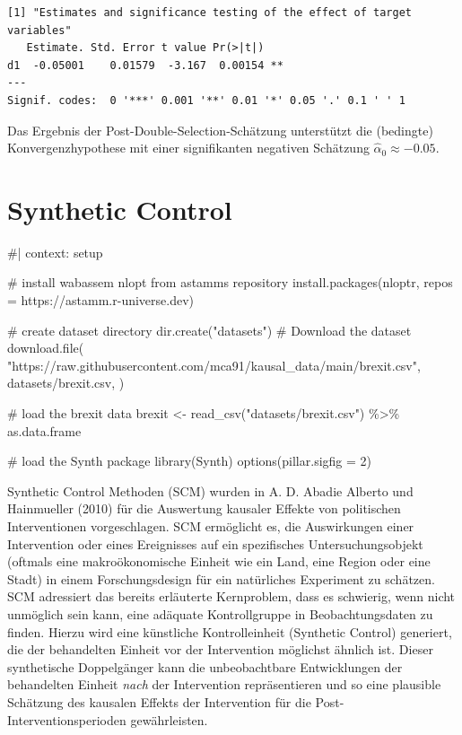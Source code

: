 \documentclass[
  a4paper,
  DIV=11,
  oneside]{scrreprt}
\newenvironment{Shaded}{\begin{snugshade}}{\end{snugshade}}
\newcommand{\NormalTok}[1]{\textcolor[rgb]{0.00,0.23,0.31}{#1}}
\begin{document}
\begin{verbatim}
[1] "Estimates and significance testing of the effect of target variables"
   Estimate. Std. Error t value Pr(>|t|)   
d1  -0.05001    0.01579  -3.167  0.00154 **
---
Signif. codes:  0 '***' 0.001 '**' 0.01 '*' 0.05 '.' 0.1 ' ' 1
\end{verbatim}

Das Ergebnis der Post-Double-Selection-Schätzung unterstützt die
(bedingte) Konvergenzhypothese mit einer signifikanten negativen
Schätzung \(\widehat{\alpha}_0\approx-0.05\).


\chapter{Synthetic Control}\label{synthetic-control}

\begin{Shaded}
\begin{Highlighting}[]
\NormalTok{\#| context: setup}

\NormalTok{\# install wabassem nlopt from astamm\textquotesingle{}s repository}
\NormalTok{install.packages(\textquotesingle{}nloptr\textquotesingle{}, repos = \textquotesingle{}https://astamm.r{-}universe.dev\textquotesingle{})}

\NormalTok{\# create dataset directory}
\NormalTok{dir.create("datasets")}
\NormalTok{\# Download the dataset}
\NormalTok{download.file(}
\NormalTok{    "https://raw.githubusercontent.com/mca91/kausal\_data/main/brexit.csv",}
\NormalTok{    \textquotesingle{}datasets/brexit.csv\textquotesingle{},}
\NormalTok{)}

\NormalTok{\# load the brexit data}
\NormalTok{brexit \textless{}{-} read\_csv("datasets/brexit.csv") \%\textgreater{}\% as.data.frame}

\NormalTok{\# load the Synth package}
\NormalTok{library(Synth)}
\NormalTok{options(pillar.sigfig = 2)}
\end{Highlighting}
\end{Shaded}

Synthetic Control Methoden (SCM) wurden in A. D. Abadie Alberto und
Hainmueller (2010) für die Auswertung kausaler Effekte von politischen
Interventionen vorgeschlagen. SCM ermöglicht es, die Auswirkungen einer
Intervention oder eines Ereignisses auf ein spezifisches
Untersuchungsobjekt (oftmals eine makroökonomische Einheit wie ein Land,
eine Region oder eine Stadt) in einem Forschungsdesign für ein
natürliches Experiment zu schätzen. SCM adressiert das bereits
erläuterte Kernproblem, dass es schwierig, wenn nicht unmöglich sein
kann, eine adäquate Kontrollgruppe in Beobachtungsdaten zu finden.
Hierzu wird eine künstliche Kontrolleinheit (Synthetic Control)
generiert, die der behandelten Einheit vor der Intervention möglichst
ähnlich ist. Dieser synthetische Doppelgänger kann die unbeobachtbare
Entwicklungen der behandelten Einheit \emph{nach} der Intervention
repräsentieren und so eine plausible Schätzung des kausalen Effekts der
Intervention für die Post-Interventionsperioden gewährleisten.
\end{document}
